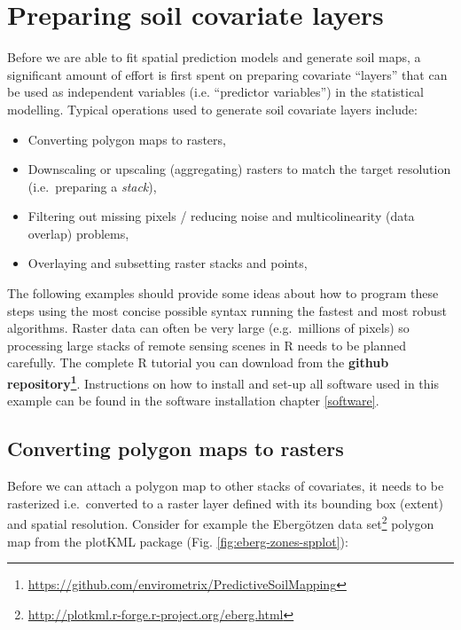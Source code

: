\documentclass[graybox,natbib,nospthms,UStrade]{svmono}
\renewcommand{\href}[2]{#2 (\url{#1})}
\renewcommand{\href}[2]{#2\footnote{\url{#1}}}
\begin{document}
\hypertarget{preparing-soil-covariate-layers}{%
\section{Preparing soil covariate layers}\label{preparing-soil-covariate-layers}}

Before we are able to fit spatial prediction models and generate soil maps, a significant amount of effort is first spent on preparing covariate ``layers'' that can be used as independent variables (i.e. ``predictor variables'') in the statistical modelling. Typical operations used to generate soil covariate layers include:

\begin{itemize}
\item
  Converting polygon maps to rasters,
\item
  Downscaling or upscaling (aggregating) rasters to match the target resolution (i.e.~preparing a \emph{stack}),
\item
  Filtering out missing pixels / reducing noise and multicolinearity (data overlap) problems,
\item
  Overlaying and subsetting raster stacks and points,
\end{itemize}

The following examples should provide some ideas about how to program these steps using the most concise possible syntax running the fastest and most robust algorithms. Raster data can often be very large (e.g.~millions of pixels) so processing large stacks of remote sensing scenes in R needs to be planned carefully. The complete R tutorial you can download from the \textbf{\href{https://github.com/envirometrix/PredictiveSoilMapping}{github repository}}. Instructions on how to install and set-up all software used in this example can be found in the software installation chapter \ref{software}.

\hypertarget{converting-polygon-maps-to-rasters}{%
\subsection{Converting polygon maps to rasters}\label{converting-polygon-maps-to-rasters}}

Before we can attach a polygon map to other stacks of covariates, it needs to be rasterized i.e.~converted to a raster layer defined with its bounding box (extent) and spatial resolution. Consider for example the \href{http://plotkml.r-forge.r-project.org/eberg.html}{Ebergötzen data set} polygon map from the plotKML package (Fig. \ref{fig:eberg-zones-spplot}):
\end{document}
